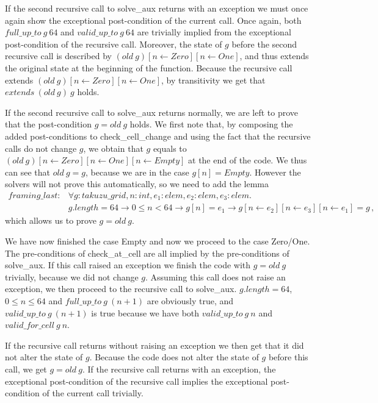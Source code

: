 \documentclass[]{StandardTemplate}
\begin{document}
If the second recursive call to solve\_aux returns with an exception we must once again show the exceptional post-condition of the current call. Once again, both $ full\_up\_to~g~64 $ and $ valid\_up\_to~g~64 $ are trivially implied from the exceptional post-condition of the recursive call. Moreover, the state of $ g $ before the second recursive call is described by $ (old~g)[n \leftarrow Zero][n \leftarrow One] $, and thus extends the original state at the beginning of the function. Because the recursive call extends $(old~g)[n \leftarrow Zero][n \leftarrow One]$, by transitivity we get that $ extends~(old~g)~g $ holds.

If the second recursive call to solve\_aux returns normally, we are left to prove that the post-condition $ g = old~g $ holds. We first note that, by composing the added post-conditions to check\_cell\_change and using the fact that the recursive calls do not change $ g $, we obtain that $g$ equals to $ (old~g)[n \leftarrow Zero][n \leftarrow One][n \leftarrow Empty] $ at the end of the code. We thus can see that $ old~g = g$, because we are in the case $ g[n] = Empty $. However the solvers will not prove this automatically, so we need to add the lemma
\begin{align*}
  framing\_last : &\forall g: takuzu\_grid, n : int, e_1 : elem, e_2 : elem, e_3 : elem. \\ &g.length = 64 \to 0 \leq n < 64 \to g[n] = e_1 \to g[n \leftarrow e_2][n \leftarrow e_3][n \leftarrow e_1] = g \,,
\end{align*}
which allows us to prove $ g=old~g $.

We have now finished the case Empty and now we proceed to the case Zero/One. The pre-conditions of check\_at\_cell are all implied by the pre-conditions of solve\_aux. If this call raised an exception we finish the code with $ g = old~g $ trivially, because we did not change $ g $. Assuming this call does not raise an exception, we then proceed to the recursive call to solve\_aux. $ g.length = 64 $, $ 0 \leq n \leq 64 $ and $ full\_up\_to~g~(n+1) $ are obviously true, and $ valid\_up\_to~g~(n+1) $ is true because we have both $ valid\_up\_to~g~n $ and $ valid\_for\_cell~g~n $.

If the recursive call returns without raising an exception we then get that it did not alter the state of $ g $. Because the code does not alter the state of $ g $ before this call, we get $ g = old~g $. If the recursive call returns with an exception, the exceptional post-condition of the recursive call implies the exceptional post-condition of the current call trivially.
\end{document}
